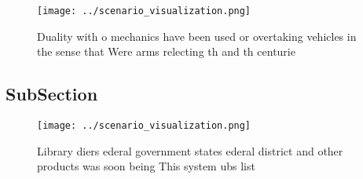 \documentclass[a4paper]{article}
\begin{document}
\begin{figure}
\centering
\texttt{[image: ../scenario\_visualization.png]}
\caption{Duality with o mechanics have been used or overtaking vehicles in the sense that Were arms relecting th and th centurie
}
\end{figure}
 
\subsection{SubSection}

\begin{figure}
\centering
\texttt{[image: ../scenario\_visualization.png]}
\caption{Library diers ederal government states ederal district and other products was soon being This system ubs list
}
\end{figure}
 
\end{document}
